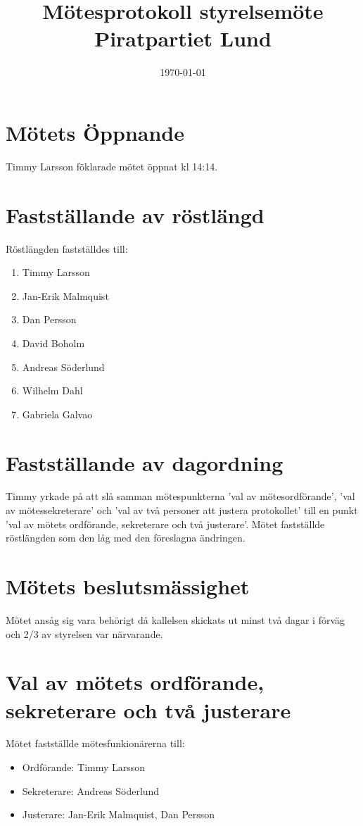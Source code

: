 \documentclass[a4paper,10pt]{article}
\title{\vspace{-1.5in}\textmd{\textbf{Mötesprotokoll styrelsemöte Piratpartiet Lund}}}
\date{\today}
\author{}
\begin{document}
\maketitle

\section{Mötets Öppnande}
Timmy Larsson föklarade mötet öppnat kl 14:14.

\section{Fastställande av röstlängd}
Röstlängden fastställdes till:
\begin{enumerate}
\item Timmy Larsson
\item Jan-Erik Malmquist
\item Dan Persson
\item David Boholm
\item Andreas Söderlund
\item Wilhelm Dahl
\item Gabriela Galvao
\end{enumerate}

\section{Fastställande av dagordning}
Timmy yrkade på att slå samman mötespunkterna 'val av mötesordförande', 'val av mötessekreterare' och 'val av två personer att justera protokollet' till en punkt 'val av mötets ordförande, sekreterare och två justerare'.
Mötet fastställde röstlängden som den låg med den föreslagna ändringen.

\section{Mötets beslutsmässighet}
Mötet ansåg sig vara behörigt då kallelsen skickats ut minst två dagar i förväg och 2/3 av styrelsen var närvarande.

\section{Val av mötets ordförande, sekreterare och två justerare}
Mötet fastställde mötesfunkionärerna till:
\begin{itemize}
\item Ordförande: Timmy Larsson
\item Sekreterare: Andreas Söderlund
\item Justerare: Jan-Erik Malmquist, Dan Persson
\end{itemize}
\end{document}
